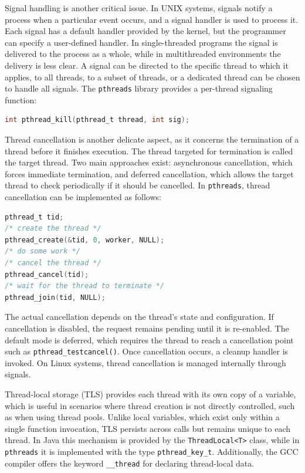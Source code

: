 Signal handling is another critical issue. In UNIX systems, signals notify a process when a particular event occurs, and a signal handler is used to process it. Each signal has a default handler provided by the kernel, but the programmer can specify a user-defined handler. In single-threaded programs the signal is delivered to the process as a whole, while in multithreaded environments the delivery is less clear. A signal can be directed to the specific thread to which it applies, to all threads, to a subset of threads, or a dedicated thread can be chosen to handle all signals. The \texttt{pthreads} library provides a per-thread signaling function:

\begin{lstlisting}[language=C]
int pthread_kill(pthread_t thread, int sig);
\end{lstlisting}

Thread cancellation is another delicate aspect, as it concerns the termination of a thread before it finishes execution. The thread targeted for termination is called the target thread. Two main approaches exist: asynchronous cancellation, which forces immediate termination, and deferred cancellation, which allows the target thread to check periodically if it should be cancelled. In \texttt{pthreads}, thread cancellation can be implemented as follows:

\begin{lstlisting}[language=C]
pthread_t tid;
/* create the thread */
pthread_create(&tid, 0, worker, NULL);
/* do some work */
/* cancel the thread */
pthread_cancel(tid);
/* wait for the thread to terminate */
pthread_join(tid, NULL);
\end{lstlisting}

The actual cancellation depends on the thread’s state and configuration. If cancellation is disabled, the request remains pending until it is re-enabled. The default mode is deferred, which requires the thread to reach a cancellation point such as \texttt{pthread\_testcancel()}. Once cancellation occurs, a cleanup handler is invoked. On Linux systems, thread cancellation is managed internally through signals.

Thread-local storage (TLS) provides each thread with its own copy of a variable, which is useful in scenarios where thread creation is not directly controlled, such as when using thread pools. Unlike local variables, which exist only within a single function invocation, TLS persists across calls but remains unique to each thread. In Java this mechanism is provided by the \texttt{ThreadLocal<T>} class, while in \texttt{pthreads} it is implemented with the type \texttt{pthread\_key\_t}. Additionally, the GCC compiler offers the keyword \texttt{\_\_thread} for declaring thread-local data.

